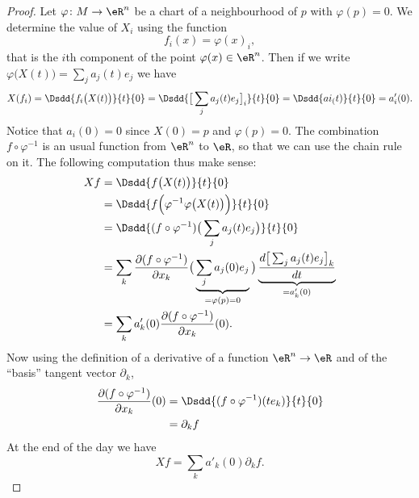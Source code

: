 \begin{proof}
	Let \( \varphi\colon M\to \eR^n\) be a chart of a neighbourhood of \( p\) with \( \varphi(p)=0\). We determine the value of \( X_i\) using the function
	\begin{equation}
		f_i(x)=\varphi(x)_i,
	\end{equation}
	that is the \( i\)th component of the point \( \varphi(x)\in\eR^n\). Then if we write \( \varphi\big( X(t) \big)=\sum_j a_j(t)e_j\) we have
	\begin{subequations}
		\begin{align}
			X(f_i)=\Dsdd{ f_i\big( X(t) \big) }{t}{0}=\Dsdd{ \big[ \sum_ja_j(t)e_j \big]_i }{t}{0}=\Dsdd{ ai_(t) }{t}{0}=a_i'(0).
		\end{align}
	\end{subequations}
	Notice that \( a_i(0)=0\) since \( X(0)=p\) and \( \varphi(p)=0\). The combination \( f\circ\varphi^{-1}\) is an usual function from \( \eR^n\) to \( \eR\), so that we can use the chain rule on it. The following computation thus make sense:
	\begin{subequations}
		\begin{align}
			Xf & =\Dsdd{ f\big( X(t) \big) }{t}{0}                                                                                                                                                            \\
			   & =\Dsdd{ f\Big( \varphi^{-1}\varphi\big( X(t) \big) \Big) }{t}{0}                                                                                                                             \\
			   & =\Dsdd{ (f\circ\varphi^{-1})\big( \sum_ja_j(t)e_j \big) }{t}{0}                                                                                                                              \\
			   & =\sum_k \frac{ \partial (f\circ\varphi^{-1}) }{ \partial x_k }\big( \underbrace{\sum_ja_j(0)e_j}_{=\varphi(p)=0} \big)\underbrace{\frac{ d\big[ \sum_ja_j(t)e_j \big]_k  }{ dt }}_{=a'_k(0)} \\
			   & =\sum_k a'_k(0)\frac{ \partial (f\circ\varphi^{-1}) }{ \partial x_k }(0).
		\end{align}
	\end{subequations}
	Now using the definition of a derivative of a function \( \eR^n\to \eR\) and of the ``basis'' tangent vector \( \partial_k\),
	\begin{subequations}
		\begin{align}
			\frac{ \partial (f\circ\varphi^{-1}) }{ \partial x_k }(0) & =\Dsdd{ (f\circ\varphi^{-1})(te_k) }{t}{0} \\
			                                                          & =\partial_k f
		\end{align}
	\end{subequations}
	At the end of the day we have
	\begin{equation}
		Xf=\sum_k a'_k(0)\partial_kf.
	\end{equation}
\end{proof}


